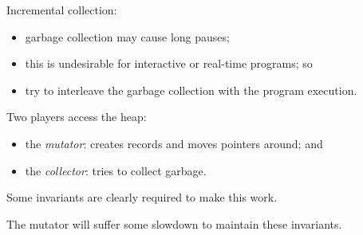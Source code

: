\begin{slide*}
Incremental collection:
\begin{itemize}
\item garbage collection may cause long pauses;
\item this is undesirable for interactive or real-time programs; so
\item try to interleave the garbage collection with the program execution.
\end{itemize}

Two players access the heap:
\begin{itemize}
\item the {\em mutator}: creates records and moves pointers around; and
\item the {\em collector}: tries to collect garbage.
\end{itemize}
Some invariants are clearly required to make this work.

The mutator will suffer some slowdown to maintain these invariants.
\vfil
\end{slide*}
 


